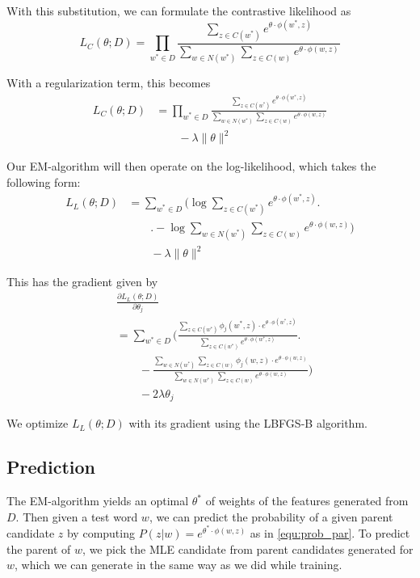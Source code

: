 \documentclass[11pt,twocolumn]{article}
\begin{document}
With this substitution, we can formulate the contrastive likelihood as
\begin{equation}
    L_C(\theta; D) = \prod_{w^*\in D} \frac{\sum_{z\in C(w^*)} e^{\theta\cdot\phi(w^*,z)}} {\sum_{w\in N(w^*)} \sum_{z\in C(w)} e^{\theta\cdot\phi(w,z)}}
\end{equation}

With a regularization term, this becomes
\begin{equation}
    \begin{split}
        L_C(\theta; D) &= \prod_{w^*\in D} \frac{\sum_{z\in C(w^*)} e^{\theta\cdot\phi(w^*,z)}} {\sum_{w\in N(w^*)} \sum_{z\in C(w)} e^{\theta\cdot\phi(w,z)}} \\
        &\qquad - \lambda \|\theta\|^2
    \end{split}
\end{equation}

Our EM-algorithm will then operate on the log-likelihood, which takes the following form:
\begin{equation}
    \begin{split}
        L_L(\theta; D) &= \sum_{w^*\in D} \Bigg(\log \sum_{z\in C(w^*)} e^{\theta\cdot\phi(w^*,z)} \Bigg.\\
        &\qquad\Bigg. -\log \sum_{w\in N(w^*)} \sum_{z\in C(w)} e^{\theta\cdot\phi(w,z)} \Bigg) \\
        &\qquad - \lambda \|\theta\|^2
    \end{split}
\end{equation}

This has the gradient given by
\begin{equation}
    \begin{split}
        &\frac{\partial L_L(\theta; D)}{\partial \theta_j} \\
        &= \sum_{w^*\in D} \Bigg( \frac{\sum_{z\in C(w^*)} \phi_j(w^*,z)\cdot e^{\theta\cdot\phi(w^*,z)}} {\sum_{z\in C(w^*)} e^{\theta\cdot\phi(w^*,z)}} \Bigg. \\
        &\qquad -\frac{\sum_{w\in N(w^*)} \sum_{z\in C(w)} \phi_j(w,z)\cdot e^{\theta\cdot\phi(w,z)}} {\sum_{w\in N(w^*)} \sum_{z\in C(w)} e^{\theta\cdot\phi(w,z)}} \Bigg) \\
        &\qquad -2\lambda\theta_j
    \end{split}
\end{equation}

We optimize $L_L(\theta; D)$ with its gradient using the LBFGS-B algorithm.

\subsection{Prediction}
The EM-algorithm yields an optimal $\theta^*$ of weights of the features generated from $D$. Then given a test word $w$, we can predict the probability of a given parent candidate $z$ by computing $P(z|w)=e^{\theta^*\cdot\phi(w,z)}$ as in \autoref{equ:prob_par}. To predict the parent of $w$, we pick the MLE candidate from parent candidates generated for $w$, which we can generate in the same way as we did while training.
\end{document}
